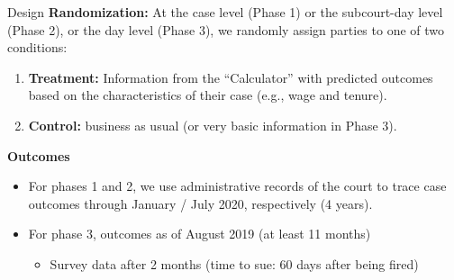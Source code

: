 \documentclass[9pt]{beamer}
\begin{document}


\begin{frame}{Design}{}
\vspace{-.5in}
   \textbf{Randomization:} At the case level (Phase 1) or the subcourt-day level (Phase 2), or the day level (Phase 3), we randomly assign parties to one of two conditions:
        
        \begin{enumerate}
            \item \textbf{Treatment:} Information from the ``Calculator'' with predicted outcomes based on the characteristics of their case (e.g., wage and tenure). 
            \item \textbf{Control:} business as usual (or very basic information in Phase 3).
        \end{enumerate}
                \vspace{4mm}
      \pause         
     \textbf{Outcomes}
     \begin{itemize}
          \item For phases 1 and 2, we use administrative records of the court to trace case outcomes through January / July 2020, respectively (4 years).
          \vspace{.05in}
         \item For phase 3, outcomes as of August 2019 (at least 11 months)
         \begin{itemize}
             \item Survey data after 2 months (time to sue: 60 days after being fired)
         \end{itemize}
               
    \end{itemize}
 
\end{frame}
\end{document}
